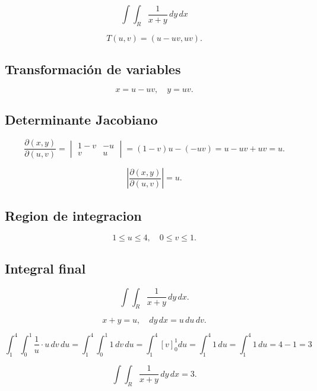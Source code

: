 \[
\int \int_R \frac{1}{x + y} \, dy \, dx
\]

\[
T(u, v) = (u - uv, uv).
\]

\subsection*{Transformación de variables}


\[
x = u - uv, \quad y = uv.
\]

\subsection*{Determinante Jacobiano}


\[
\frac{\partial(x, y)}{\partial(u, v)}  =  \begin{vmatrix} 
1 - v & -u \\ 
v & u 
\end{vmatrix} = (1 - v)u - (-uv) = u - uv + uv = u.
\]


\[
\left| \frac{\partial(x, y)}{\partial(u, v)} \right| = u.
\]

\subsection*{Region de integracion}




\[
1 \leq u \leq 4, \quad 0 \leq v \leq 1.
\]

\subsection*{Integral final }


\[
\int \int_R \frac{1}{x + y} \, dy \, dx.
\]


\[
x + y = u, \quad dy \, dx  = u \, du \, dv.
\]


\[
\int_1^4 \int_0^1 \frac{1}{u} \cdot u \, dv \, du = \int_1^4 \int_0^1 1 \, dv \, du =
\int_1^{4} \left[ v \right]_0^1 du = 
\int_1^4 1 \, du =
\int_1^4 1 \, du = 4 - 1 = 3
\]


\[
\int \int_R \frac{1}{x + y} \, dy \, dx = 3.
\]

